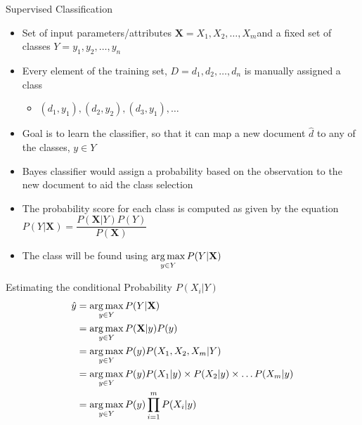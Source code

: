 \begin{frame}{Supervised Classification}
\begin{itemize}
	\item Set of input parameters/attributes $\textbf{X} = {X_1,X_2,\ldots, X_m}$and a fixed set of classes $Y = {y_1,y_2,\ldots, y_n}$
	\item Every element of the training set, $D={d_1,d_2,\ldots,d_n} $ is manually assigned a class
	\begin{itemize}
		\item [] $(d_1,y_1), (d_2,y_2),(d_3,y_1), \ldots$
	\end{itemize}
	\item Goal is to learn the classifier, so that it can map a new document $\hat{d}$ to any of the classes, $y \in Y$
	\item Bayes classifier would assign a probability based on the observation to the new document to aid the class selection
	\item The probability score for each class is computed as given by the equation $P(Y|\textbf{X}) = \dfrac{P(\textbf{X}|Y)P(Y)}{P(\textbf{X})}$
	\item The class will be found using $\displaystyle \operatorname*{\arg\max}_{y\in Y} P(Y|\textbf{X})$
\end{itemize}
\end{frame}

\begin{frame}{Estimating the conditional Probability $P(X_i|Y)$}
\begin{align}
\hat{y} &=\operatorname*{\arg\max}_{y\in Y} P(Y|\textbf{X})\\
&=\operatorname*{\arg\max}_{y\in Y}P(\textbf{X}|y)P(y)\\
&=\operatorname*{\arg\max}_{y\in Y}P(y)P(X_1,X_2,X_m|Y)\\
&=\operatorname*{\arg\max}_{y\in Y}P(y)P(X_1|y)\times P(X_2|y)\times \ldots P(X_m|y)\\
&=\operatorname*{\arg\max}_{y\in Y}P(y)\prod_{i=1}^{m}P(X_i|y)
\end{align}
\end{frame}

